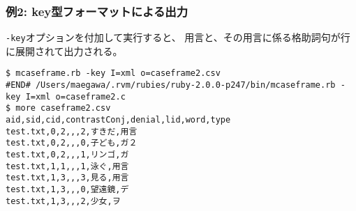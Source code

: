\subsubsection*{例2: key型フォーマットによる出力}

\verb|-key|オプションを付加して実行すると、
用言と、その用言に係る格助詞句が行に展開されて出力される。


\begin{Verbatim}[baselinestretch=0.7,frame=single]
$ mcaseframe.rb -key I=xml o=caseframe2.csv
#END# /Users/maegawa/.rvm/rubies/ruby-2.0.0-p247/bin/mcaseframe.rb -key I=xml o=caseframe2.c
$ more caseframe2.csv
aid,sid,cid,contrastConj,denial,lid,word,type
test.txt,0,2,,,2,すきだ,用言
test.txt,0,2,,,0,子ども,ガ２
test.txt,0,2,,,1,リンゴ,ガ
test.txt,1,1,,,1,泳ぐ,用言
test.txt,1,3,,,3,見る,用言
test.txt,1,3,,,0,望遠鏡,デ
test.txt,1,3,,,2,少女,ヲ
\end{Verbatim}

